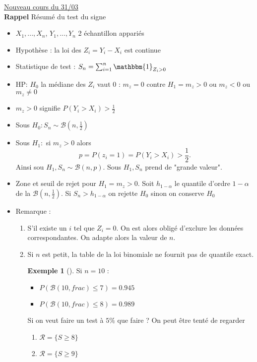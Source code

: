 \documentclass{article}
\theoremstyle{plain}%
\theoremstyle{definition}
\newtheorem{exmp}{Exemple}[section]
\theoremstyle{remark}
\begin{document}
\underline{Nouveau cours du 31/03} \\
\textbf{Rappel} Résumé du test du signe
\begin{itemize}
    \item $ X_1, ..., X_n $, $ Y_1, ..., Y_n $ 2 échantillon appariés
    \item Hypothèse : la loi des $ Z_i = Y_i - X_i$ est continue
    \item Statistique de test : $ S_n = \sum_{i=1}^{n}\mathbbm{1}_{Z_i > 0} $ 
    \item HP: $ H_0 $ la médiane des $ Z_i $ vaut 0 : $ m_z = 0 $ contre $ H_1 = m_z > 0 $ ou $ m_z < 0 $ ou $ m_z \neq 0 $ 
    \item $ m_z > 0 $ signifie $ P(Y_i > X_i) > \frac{1}{2} $ 
    \item Sous $ H_0 : S_n \sim \mathcal{B}(n, \frac{1}{2}) $ 
    \item Sous $ H_1 : $ si $ m_z > 0  $ alors 
    \[
        p = P(z_i = 1) = P(Y_i > X_i) > \frac{1}{2}
    .\]
    Ainsi sou $ H_1, S_n \sim \mathcal{B}(n,p) $. Sous $ H_1, S_n $ prend de "grande valeur".
    \item Zone et seuil de rejet pour $ H_1 = m_z > 0 $. Soit $ h_{1-\alpha } $ le quantile d'ordre $ 1 - \alpha  $ de la $ \mathcal{B}(n ,\frac{1}{2}) $. Si $ S_n > h_{1 - \alpha } $  on rejette $ H_0 $ sinon on conserve $ H_0 $ 
    \item Remarque : \begin{enumerate}
        \item S'il existe un $ i $ tel que $ Z_i = 0 $. On est alors obligé d'exclure les données correspondantes. On adapte alors la valeur de $n$.
        \item Si $ n $ est petit, la table de la loi binomiale ne fournit pas de quantile exact. \begin{exmp}[]
            Si $ n=10 $ : \begin{itemize}
                \item $ P(\mathcal{B}(10, frac) \leq 7) = 0.945$
                \item $ P(\mathcal{B}(10, frac) \leq 8) = 0.989$
            \end{itemize}
            Si on veut faire un test à $ 5\% $ que faire ? On peut être tenté de regarder \begin{enumerate}
                \item $ \mathcal{R} = \{S \geq 8\} $ 
                \item $ \mathcal{R} = \{S \geq 9\} $ 
            \end{enumerate}

\end{exmp}
\end{enumerate}
\end{itemize}
\end{document}
